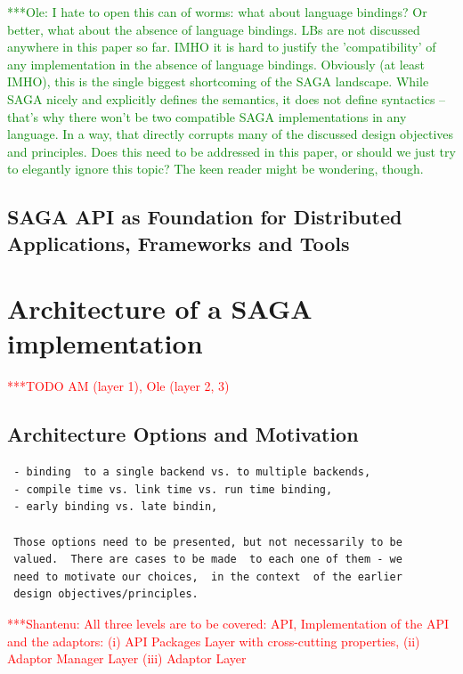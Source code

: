 \documentclass[a4paper,12pt]{article}
\newcommand{\todo}[1]{     {\textcolor{red}  { ***TODO      #1 }}}
\newcommand{\jhanote}[1]{  {\textcolor{red}  { ***Shantenu: #1 }}}
\newcommand{\onote}[1]{    {\textcolor{green}{ ***Ole:      #1 }}}
\newcommand{\todo}[1]{}
\newcommand{\jhanote}[1]{}
\newcommand{\onote}[1]{}
\begin{document}
\onote{I hate to open this can of worms: what about language bindings? Or
better, what about the absence of language bindings. LBs are not discussed
anywhere in this paper so far. IMHO it is hard to justify the 'compatibility'
of any implementation in the absence of language bindings.  Obviously (at least
IMHO), this is the single biggest shortcoming of the SAGA landscape. While SAGA
nicely and explicitly defines the semantics, it does not define syntactics --
that's why there won't be two compatible SAGA implementations in any language.
In a way, that directly corrupts many of the discussed design objectives and
principles.  Does this need to be addressed in this paper, or should we just
try to elegantly ignore this topic? The keen reader might be wondering,
though.}

 \subsection{SAGA API as Foundation for Distributed Applications,
 Frameworks and Tools}

% 
\section{Architecture of a SAGA implementation} \todo{AM (layer 1), Ole (layer 2, 3)}
\label{sec.architecture}


\subsection{Architecture Options and Motivation}

\begin{verbatim}
 - binding  to a single backend vs. to multiple backends,
 - compile time vs. link time vs. run time binding,
 - early binding vs. late bindin,
 
 Those options need to be presented, but not necessarily to be 
 valued.  There are cases to be made  to each one of them - we 
 need to motivate our choices,  in the context  of the earlier 
 design objectives/principles.
\end{verbatim}

\jhanote{All three levels are to be covered: API, Implementation of
  the API and the adaptors: (i) API Packages Layer with cross-cutting
  properties, (ii) Adaptor Manager Layer (iii) Adaptor Layer}

\end{document}
